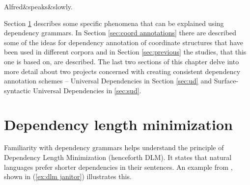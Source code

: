 \begin{exe}
    \ex
    \label{ex:tesniere today}
    \begin{dependency}[theme = simple]
    \begin{deptext}
        Alfred\&speaks\&slowly.\\
    \end{deptext}
    \end{dependency}
\end{exe} 

Section \ref{sec:dlm} describes some specific phenomena that can be explained using dependency grammars. In Section \ref{sec:coord annotations} there are described some of the ideas for dependency annotation of coordinate structures that have been used in different corpora and in Section \ref{sec:previous} the studies, that this one is based on, are described. The last two sections of this chapter delve into more detail about two projects concerned with creating consistent dependency annotation schemes -- Universal Dependencies in Section \ref{sec:ud} and Surface-syntactic Universal Dependencies in \ref{sec:sud}. 

\section{Dependency length minimization}\label{sec:dlm}
Familiarity with dependency grammars helps understand the principle of Dependency Length Minimization (henceforth DLM). It states that natural languages prefer shorter dependencies in their sentences. An example from \cite{hp83}, shown in (\ref{ex:dlm janitor}) illustrates this.

